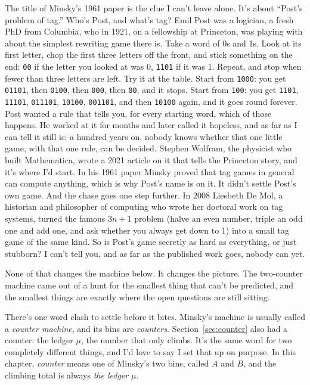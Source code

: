 \documentclass[11pt,twoside]{article}
\theoremstyle{thielethm}
\theoremstyle{thieledef}
\theoremstyle{thieledef}
\theoremstyle{thieledef}
\theoremstyle{thielethm}
\theoremstyle{thieleobs}
\theoremstyle{thielethm}
\begin{document}
The title of Minsky's 1961 paper is the clue I can't leave alone. It's about ``Post's problem of
tag.'' Who's Post, and what's tag? Emil Post was a logician, a fresh PhD from Columbia, who in
1921, on a fellowship at Princeton, was playing
with about the simplest rewriting game there is. Take a word of 0s and 1s. Look at its first
letter, chop the first three letters off the front, and stick something on the end:
\texttt{00} if the letter you looked at was 0, \texttt{1101} if it was 1. Repeat, and stop when
fewer than three letters are left. Try it at the table. Start from \texttt{1000}: you get
\texttt{01101}, then \texttt{0100}, then \texttt{000}, then \texttt{00}, and it stops. Start from
\texttt{100}: you get \texttt{1101}, \texttt{11101}, \texttt{011101}, \texttt{10100},
\texttt{001101}, and then \texttt{10100} again, and it goes round forever. Post wanted a rule
that tells you, for every starting word, which of those happens. He worked at it for months and
later called it hopeless, and as far as I can tell it still is: a hundred years on, nobody knows
whether that one little game, with that one rule, can be decided. Stephen Wolfram, the physicist
who built Mathematica, wrote a 2021
article on it that tells the Princeton story, and it's where I'd start. In his 1961 paper Minsky proved
that tag games in general can compute anything, which is why Post's name is on it. It didn't settle Post's
own game. And the chase goes one step further. In 2008 Liesbeth De Mol, a historian and philosopher
of computing who wrote her doctoral work on tag systems, turned
the famous $3n+1$ problem (halve an even number, triple an odd one and add one, and ask whether
you always get down to 1) into a small tag game of the same kind. So is Post's game secretly as
hard as everything, or just stubborn? I can't tell you, and as far as the published work goes,
nobody can yet.

None of that changes the machine below. It changes the picture. The two-counter machine came
out of a hunt for the smallest thing that can't be predicted, and the smallest things are exactly
where the open questions are still sitting.

There's one word clash to settle before it bites. Minsky's machine is usually called a \emph{counter machine},
and its bins are \emph{counters}. Section~\ref{sec:counter} also had a counter: the ledger $\mu$, the number that only
climbs. It's the same word for two completely different things, and I'd love to say I set that up on
purpose. In this chapter, \emph{counter} means one of Minsky's two bins, called $A$ and $B$, and
the climbing total is always \emph{the ledger} $\mu$.
\end{document}
